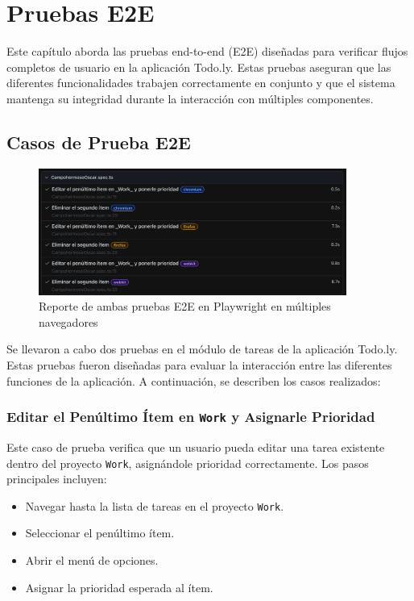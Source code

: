 \documentclass{report}
\begin{document}
\chapter{Pruebas E2E}

Este capítulo aborda las pruebas end-to-end (E2E) diseñadas para verificar flujos completos de usuario en la aplicación Todo.ly. Estas pruebas aseguran que las diferentes funcionalidades trabajen correctamente en conjunto y que el sistema mantenga su integridad durante la interacción con múltiples componentes.

\section{Casos de Prueba E2E}
\begin{figure}[h!]
    \centering
    \includegraphics[width=0.9\textwidth]{./imgs/playwright/Captura de pantalla 2024-11-17 a la(s) 21.49.35.png}
    \caption{Reporte de ambas pruebas E2E en Playwright en múltiples navegadores}
    \label{fig:tcsplaywright}
\end{figure}

Se llevaron a cabo dos pruebas en el módulo de tareas de la aplicación Todo.ly. Estas pruebas fueron diseñadas para evaluar la interacción entre las diferentes funciones de la aplicación. A continuación, se describen los casos realizados:

\subsection{Editar el Penúltimo Ítem en \texttt{Work} y Asignarle Prioridad}

Este caso de prueba verifica que un usuario pueda editar una tarea existente dentro del proyecto \texttt{Work}, asignándole prioridad correctamente. Los pasos principales incluyen:
\begin{itemize}
    \item Navegar hasta la lista de tareas en el proyecto \texttt{Work}.
    \item Seleccionar el penúltimo ítem.
    \item Abrir el menú de opciones.
    \item Asignar la prioridad esperada al ítem.
\end{itemize}
\end{document}
